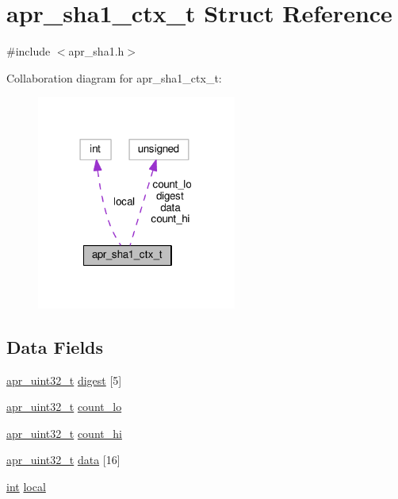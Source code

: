 \hypertarget{structapr__sha1__ctx__t}{}\section{apr\+\_\+sha1\+\_\+ctx\+\_\+t Struct Reference}
\label{structapr__sha1__ctx__t}


{\ttfamily \#include $<$apr\+\_\+sha1.\+h$>$}



Collaboration diagram for apr\+\_\+sha1\+\_\+ctx\+\_\+t\+:
\nopagebreak
\begin{figure}[H]
\begin{center}
\leavevmode
\includegraphics[width=186pt]{structapr__sha1__ctx__t__coll__graph}
\end{center}
\end{figure}
\subsection*{Data Fields}
\begin{DoxyCompactItemize}
\item 
\hyperlink{group__apr__platform_ga558548a135d8a816c4787250744ea147}{apr\+\_\+uint32\+\_\+t} \hyperlink{structapr__sha1__ctx__t_a152a127b59eb6e1cb686c2bbe00d51de}{digest} \mbox{[}5\mbox{]}
\item 
\hyperlink{group__apr__platform_ga558548a135d8a816c4787250744ea147}{apr\+\_\+uint32\+\_\+t} \hyperlink{structapr__sha1__ctx__t_ab105efa48b9318a419525e0f6076f6d2}{count\+\_\+lo}
\item 
\hyperlink{group__apr__platform_ga558548a135d8a816c4787250744ea147}{apr\+\_\+uint32\+\_\+t} \hyperlink{structapr__sha1__ctx__t_a32a4c5248869c36344cc7aac8b87f2d1}{count\+\_\+hi}
\item 
\hyperlink{group__apr__platform_ga558548a135d8a816c4787250744ea147}{apr\+\_\+uint32\+\_\+t} \hyperlink{structapr__sha1__ctx__t_af61fc6c30be244247e35e7c8b0b63407}{data} \mbox{[}16\mbox{]}
\item 
\hyperlink{pcre_8txt_a42dfa4ff673c82d8efe7144098fbc198}{int} \hyperlink{structapr__sha1__ctx__t_aaa8433058ac7a3b0649821cbab7de822}{local}
\end{DoxyCompactItemize}


